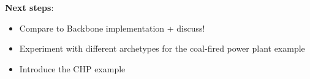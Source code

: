 \documentclass[10pt,english]{article}
\begin{document}
\textbf{Next steps}:
\begin{itemize}
\item Compare to Backbone implementation + discuss!
\item Experiment with different archetypes for the coal-fired power plant example
\item Introduce the CHP example
\end{itemize}



\clearpage
\tableofcontents


\clearpage

































% 
% 




% 
% 
\end{document}
